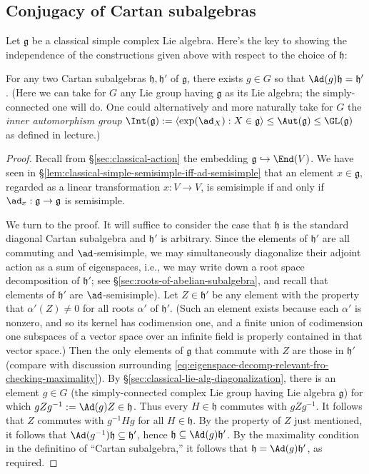 \documentclass[reqno]{amsart} 
\begin{document}
\subsection{Conjugacy of Cartan subalgebras}
\label{sec:orgf4e7f31}
Let $\mathfrak{g}$ be a classical simple complex Lie algebra.  Here's the key to showing the independence of the constructions given above with respect to the choice of $\mathfrak{h}$:
\begin{lemma}\label{lem:conj-cartan-classical-case}
  For any two Cartan subalgebras $\mathfrak{h}, \mathfrak{h} '$ of $\mathfrak{g}$, there exists $g \in G$ so that $\Ad(g) \mathfrak{h} = \mathfrak{h} '$.  (Here we can take for $G$ any Lie group having $\mathfrak{g}$ as its Lie algebra; the simply-connected one will do.  One could alternatively and more naturally take for $G$ the \emph{inner automorphism group} $\Int(\mathfrak{g}) := \langle \exp(\ad_X) : X \in \mathfrak{g} \rangle \leq \Aut(\mathfrak{g}) \leq \GL(\mathfrak{g})$ as defined in lecture.)
\end{lemma}
\begin{proof}
  Recall from \S\ref{sec:classical-action} the embedding $\mathfrak{g} \hookrightarrow \End(V)$.  We have seen in \S\ref{lem:classical-simple-semisimple-iff-ad-semisimple} that an element $x \in \mathfrak{g}$, regarded as a linear transformation $x : V \rightarrow V$, is semisimple if and only if $\ad_x : \mathfrak{g} \rightarrow \mathfrak{g}$ is semisimple.

  We turn to the proof.  It will suffice to consider the case that $\mathfrak{h}$ is the standard diagonal Cartan subalgebra and $\mathfrak{h} '$ is arbitrary.  Since the elements of $\mathfrak{h} '$ are all commuting and $\ad$-semisimple, we may simultaneously diagonalize their adjoint action as a sum of eigenspaces, i.e., we may write down a root space decomposition of $\mathfrak{h} '$; see \S\ref{sec:roots-of-abelian-subalgebra}, and recall that elements of $\mathfrak{h}'$ are $\ad$-semisimple).  Let $Z \in \mathfrak{h}'$ be any element with the property that $\alpha '(Z) \neq 0$ for all roots $\alpha '$ of $\mathfrak{h} '$.  (Such an element exists because each $\alpha '$ is nonzero, and so its kernel has codimension one, and a finite union of codimension one subspaces of a vector space over an infinite field is properly contained in that vector space.)  Then the only elements of $\mathfrak{g}$ that commute with $Z$ are those in $\mathfrak{h} '$ (compare with discussion surrounding \eqref{eq:eigenspace-decomp-relevant-fro-checking-maximality}).  By \S\ref{sec:classical-lie-alg-diagonalization}, there is an element $g \in G$ (the simply-connected complex Lie group having Lie algebra $\mathfrak{g}$) for which $g Z g^{-1} := \Ad(g) Z \in \mathfrak{h}$.  Thus every $H \in \mathfrak{h}$ commutes with $g Z g^{-1}$.  It follows that $Z$ commutes with $g^{-1} H g$ for all $H \in \mathfrak{h}$.  By the property of $Z$ just mentioned, it follows that $\Ad(g^{-1}) \mathfrak{h} \subseteq \mathfrak{h} '$, hence $\mathfrak{h} \subseteq \Ad(g) \mathfrak{h} '$.  By the maximality condition in the definitino of ``Cartan subalgebra,'' it follows that $\mathfrak{h} = \Ad(g) \mathfrak{h} '$, as required.
\end{proof}
\end{document}
